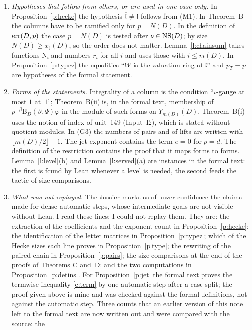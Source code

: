 \documentclass[11pt,a4paper]{article}
\theoremstyle{plainx}
\theoremstyle{uprightx}
\newcommand{\cj}[1]{\overline{#1}}
\newcommand{\xoD}[1]{x_1(#1)}
\newcommand{\mD}[1]{m(#1)}
\newcommand{\ND}[1]{N(#1)}
\newcommand{\YD}[2]{Y_{#2}(#1)}
\newcommand{\Bch}[3]{\mathrm{B}_{#1}(#2,#3)}
\begin{document}
\begin{enumerate}[label=\textup{\arabic*.},leftmargin=1.6em,itemsep=5pt]
definitions opaque and are no part of the proofs.
\item \emph{Hypotheses that follow from others, or are used in one case only.} In Proposition~\ref{p:hecke} the
hypothesis $\cj{\mathfrak{l}}\ne\mathfrak{l}$ follows from (M1). In Theorem~B the columns have to be ramified
only for $p=\ND{D}$. In the definition of $\mathrm{err}(D,p)$ the case $p=\ND{D}$ is tested after $p\in\mathrm{NS}(D)$; by
size $\ND{D}\ge \xoD{D}$, so the order does not matter. Lemma~\ref{l:chainsum} takes functions $\mathrm{N}_i$ and
numbers $r_i$ for all $i$ and uses those with $i\le \mD{D}$. In Proposition~\ref{p:typez} the equalities ``$W$ is the
valuation ring at $\mathfrak{l}$'' and $p_T=p$ are hypotheses of the formal statement.
\item \emph{Forms of the statements.} Integrality of a column is the condition ``$\iota$-gauge at most $1$ at~$1$'';
Theorem~B(ii) is, in the formal text, membership of $p^{-\beta}\Bch{D}{\vartheta}{\Psi}\varphi$ in the module of
such forms on $\YD{D}{\mD{D}}$. Theorem~B(i) uses the notion of index of unit~149 (Input~I2), which is stated without quotient
modules. In (G3) the numbers of pairs and of lifts
are written with $\lfloor \mD{D}/2\rfloor-1$. The jet exponent contains the term $e=0$ for $p=d$. The definition of
the restriction contains the proof that it maps forms to forms. Lemma~\ref{l:level}(b) and
Lemma~\ref{l:served}(a) are instances in the formal text: the first is found by Lean whenever a level is needed,
the second feeds the tactic of size comparisons.
\item \emph{What was not replayed.} The dossier marks as of lower confidence the claims made for dense
automatic steps, whose intermediate goals are not visible without Lean. I read these lines; I could not replay
them. They are: the extraction of
the coefficients and the exponent count in Proposition~\ref{p:hecke}; the identification of the letter matrices in Proposition~\ref{p:typez}; which of
the Hecke sizes each line proves in Proposition~\ref{p:type}; the rewriting of the paired chain in
Proposition~\ref{p:pairs}; the size comparisons at the end of the proofs of Theorems C and~D; and the two
computations in Proposition~\ref{p:detins}. For Proposition~\ref{p:jet} the formal text proves the termwise
inequality \eqref{e:term} by one automatic step after a case split; the proof given above is mine and was
checked against the formal definitions, not against the automatic step. Three counts that an earlier
version of this note left to the formal text are now written out and were compared with the source: the

\end{enumerate}
\end{document}
